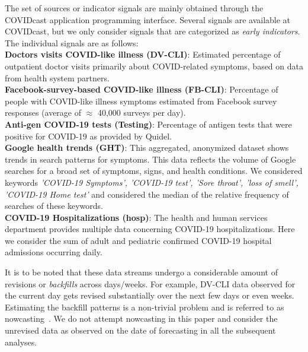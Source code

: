 \documentclass[conference,compsoc]{IEEEtran}
\begin{document}
The set of sources or indicator signals are mainly obtained through the COVIDcast application programming interface\cite{reinhart2021open}. Several signals are available at COVIDcast, but we only consider signals that are categorized as \emph{early indicators}. The individual signals are as follows:
\\
\textbf{Doctors visits COVID-like illness (DV-CLI)}: Estimated percentage of outpatient doctor visits primarily about COVID-related symptoms, based on data from health system partners.
\\
\textbf{Facebook-survey-based COVID-like illness (FB-CLI)}: Percentage of people with COVID-like illness symptoms estimated from Facebook survey responses (average of $\approx$ 40,000 surveys per day).
\\
\textbf{Anti-gen COVID-19 tests (Testing)}: Percentage of antigen tests that were positive for COVID-19 as provided by Quidel.  
\\
\textbf{Google health  trends (GHT)}: This aggregated, anonymized dataset shows trends in search patterns for symptoms. This data reflects the volume of Google searches for a broad set of symptoms, signs, and health conditions. We considered keywords \emph{'COVID-19 Symptoms', 'COVID-19 test', 'Sore throat', 'loss of smell', 'COVID-19 Home test'} and considered the median of the relative frequency of searches of these keywords. 
\\
\textbf{COVID-19 Hospitalizations (hosp)}: The health and human services department provides multiple data concerning COVID-19 hospitalizations. Here we consider the sum of adult and pediatric confirmed COVID-19 hospital admissions occurring daily.

It is to be noted that these data streams undergo a  considerable amount of revisions or \emph{backfills} across days/weeks. For example, DV-CLI data observed for the current day gets revised substantially over the next few days or even weeks. Estimating the backfill patterns is a non-trivial problem and is referred to as nowcasting~\cite{mcdonald2021can}. We do not attempt nowcasting in this paper and consider the unrevised data as observed on the date of forecasting in all the subsequent analyses. %
\end{document}
